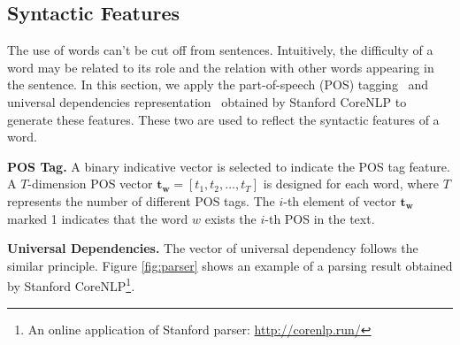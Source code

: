 \subsection{Syntactic Features}
The use of words can't be cut off from sentences. 
Intuitively, the difficulty of a word may be related to its role 
and the relation with other words appearing in the sentence.
In this section, we apply the part-of-speech (POS) tagging~\cite{toutanova2003feature} and universal dependencies representation~\cite{schuster2016enhanced} obtained by Stanford CoreNLP to generate these features. 
These two are used to  reflect the syntactic features of a word.

\textbf{POS Tag.} A binary indicative vector is selected to indicate the POS tag feature.
A $T$-dimension POS vector $\mathbf{t_w}=[t_1, t_2,\dots, t_T]$ is designed for each word, where $T$ represents the number of different POS tags. The $i$-th element of vector $\mathbf{t_w}$ marked 1 indicates that the word $w$ exists the $i$-th POS in the text.

\textbf{Universal Dependencies.}
	The vector of universal dependency follows the similar principle.
Figure \ref{fig:parser} shows an example of a parsing result obtained by Stanford CoreNLP\footnote{An online application of Stanford parser: \url{http://corenlp.run/}}.

